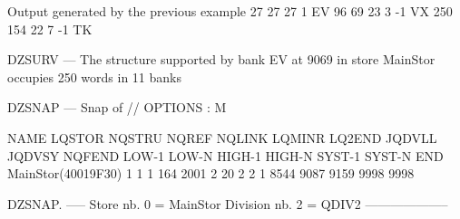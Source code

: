 \begin{Listing}{Output generated by the previous example}
     27     27    27    1     EV                                                                                                 
     96     69    23    3       -1 VX                                                                                            
    250    154    22    7            -1 TK                                                                                       


                                                                                                                                 
DZSURV --- The structure supported by bank EV   at       9069 in store MainStor occupies        250 words in     11 banks        
                                                                                                                                 
DZSNAP --- Snap of //                                                                              OPTIONS : M                   
                                                                                                                                 
  NAME       LQSTOR NQSTRU  NQREF NQLINK LQMINR LQ2END JQDVLL JQDVSY NQFEND  LOW-1  LOW-N HIGH-1 HIGH-N SYST-1 SYST-N    END     
 MainStor(40019F30)      1      1      1    164   2001      2     20      2      2      1   8544   9087   9159   9998   9998     
                                                                                                                                 
DZSNAP.   -----  Store nb. 0 = MainStor Division nb. 2 = QDIV2                       --------------------                        
                                                                                                                                 

\end{Listing}
